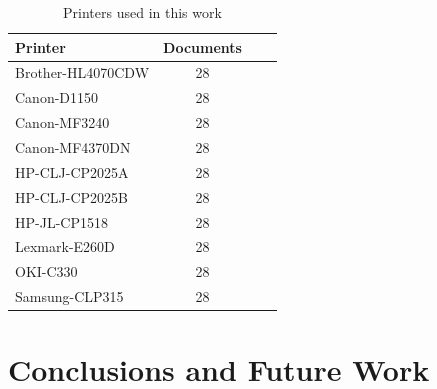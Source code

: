 \documentclass[10pt,twocolumn,letterpaper]{article}
\begin{document}
\begin{table}
\caption{Printers used in this work}
\begin{center}
\begin{tabular}{l*{2}{c}r}
Printer           & Documents \\
\hline
Brother-HL4070CDW & 28 \\
Canon-D1150 & 28 \\
Canon-MF3240 & 28 \\
Canon-MF4370DN & 28 \\
HP-CLJ-CP2025A & 28 \\
HP-CLJ-CP2025B & 28 \\
HP-JL-CP1518 & 28 \\
Lexmark-E260D & 28 \\
OKI-C330 & 28 \\
Samsung-CLP315 & 28 \\
\end{tabular}
\end{center}
\end{table}


\section{Conclusions and Future Work}


{\small


}
\end{document}
